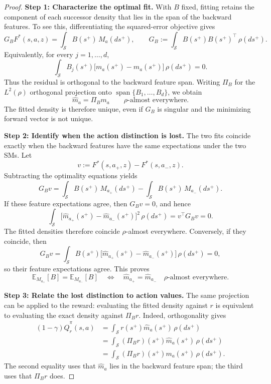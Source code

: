 \begin{proof}
\noindent\textbf{Step 1: Characterize the optimal fit.}
With $B$ fixed, fitting retains the component of each successor density that lies in the span of the backward features.
To see this, differentiating the squared-error objective gives
\[
    G_B F^*(s,a,z)
    =\int_{\mathcal S}B(s^+)\,M_a(ds^+),
    \qquad
    G_B:=\int_{\mathcal S}
    B(s^+)B(s^+)^\top\,\rho(ds^+).
\]
Equivalently, for every $j=1,\ldots,d$,
\[
    \int_{\mathcal S}
    B_j(s^+)\bigl[m_a(s^+)-\widehat m_a(s^+)\bigr]
    \,\rho(ds^+)=0.
\]
Thus the residual is orthogonal to the backward feature span.
Writing $\Pi_B$ for the $L^2(\rho)$ orthogonal projection onto $\operatorname{span}\{B_1,\ldots,B_d\}$, we obtain
\[
    \widehat m_a=\Pi_Bm_a
    \qquad \rho\text{-almost everywhere}.
\]
The fitted density is therefore unique, even if $G_B$ is singular and the minimizing forward vector is not unique.

\noindent\textbf{Step 2: Identify when the action distinction is lost.}
The two fits coincide exactly when the backward features have the same expectations under the two SMs.
Let
\[
    v:=F^*(s,a_+,z)-F^*(s,a_-,z).
\]
Subtracting the optimality equations yields
\[
    G_Bv
    =\int_{\mathcal S}B(s^+)\,M_{a_+}(ds^+)
     -\int_{\mathcal S}B(s^+)\,M_{a_-}(ds^+).
\]
If these feature expectations agree, then $G_Bv=0$, and hence
\[
    \int_{\mathcal S}
    \bigl[\widehat m_{a_+}(s^+)-\widehat m_{a_-}(s^+)\bigr]^2
    \,\rho(ds^+)
    =v^\top G_Bv=0.
\]
The fitted densities therefore coincide $\rho$-almost everywhere.
Conversely, if they coincide, then
\[
    G_Bv
    =\int_{\mathcal S}B(s^+)
    \bigl[\widehat m_{a_+}(s^+)-\widehat m_{a_-}(s^+)\bigr]
    \,\rho(ds^+)=0,
\]
so their feature expectations agree.
This proves
\[
    \mathbb E_{M_{a_+}}[B]=\mathbb E_{M_{a_-}}[B]
    \quad\Longleftrightarrow\quad
    \widehat m_{a_+}=\widehat m_{a_-}
    \quad \rho\text{-almost everywhere}.
\]

\noindent\textbf{Step 3: Relate the lost distinction to action values.}
The same projection can be applied to the reward: evaluating the fitted density against $r$ is equivalent to evaluating the exact density against $\Pi_Br$.
Indeed, orthogonality gives
\[
\begin{aligned}
    (1-\gamma)\widehat Q_r^\pi(s,a)
    &=\int_{\mathcal S}
      r(s^+)\widehat m_a(s^+)\,\rho(ds^+)\\
    &=\int_{\mathcal S}
      (\Pi_Br)(s^+)\widehat m_a(s^+)\,\rho(ds^+)\\
    &=\int_{\mathcal S}
      (\Pi_Br)(s^+)m_a(s^+)\,\rho(ds^+).
\end{aligned}
\]
The second equality uses that $\widehat m_a$ lies in the backward feature span; the third uses that $\Pi_Br$ does.


\end{proof}
